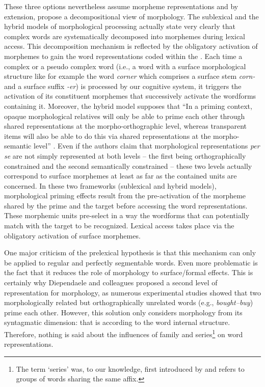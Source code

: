 \documentclass[output=paper]{langsci/langscibook}
\begin{document}
These three options nevertheless assume  morpheme representations and by
extension, propose a decompositional view of morphology. The sublexical and
the hybrid models of morphological processing actually state very
clearly that complex words are systematically decomposed into morphemes
during lexical access. This decomposition mechanism is reflected by the
obligatory activation of morphemes to gain the word representations
coded within the . Each time a complex or a pseudo complex
word (i.e., a word with a surface morphological structure like for
example the word \emph{corner} which comprises a surface stem
\emph{corn-} and a surface suffix \emph{-er}) is processed by our
cognitive system, it triggers the activation of its constituent
morphemes that successively activate the wordforms containing it.
Moreover, the hybrid model supposes that ``In a priming context, opaque
morphological relatives will only be able to prime each other through
shared representations at the morpho-orthographic level, whereas
transparent items will also be able to do this via shared
representations at the morpho-semantic level'' %
\citep[896]{Diependaele2009}%
%
%
. Even if the authors claim that morphological representations
\emph{per se} are not simply represented at both levels -- the first
being orthographically constrained and the second semantically
constrained -- these two levels actually correspond to surface morphemes
at least as far as the contained units are concerned. In these two
frameworks (sublexical and hybrid models), morphological priming effects
result from the pre-activation of the morpheme shared by the prime and
the target before accessing the word representations. These morphemic
units pre-select in a way the wordforms that can potentially match with
the target to be recognized. Lexical access takes place via the
obligatory activation of surface morphemes.

One major criticism of the prelexical hypothesis is that this mechanism
can only be applied to regular and perfectly segmentable words. Even
more problematic is the fact that it reduces the role of morphology to
surface/formal effects. This is certainly why Diependaele and
colleagues proposed a second level of representation for morphology, as
numerous experimental studies showed that two morphologically related
but orthographically unrelated words (e.g., \emph{bought--buy}) prime
each other. However,  this solution only considers
morphology from its syntagmatic dimension: that is according to the word
internal structure. Therefore, nothing is said about the influences of
family and series\footnote{The term `series' was, to our knowledge,
  first introduced by %
\citet{Hathout2005,hathout2008.textgraphs3} %
%
and refers to groups of words
  sharing the same affix.} on word representations.
\end{document}
